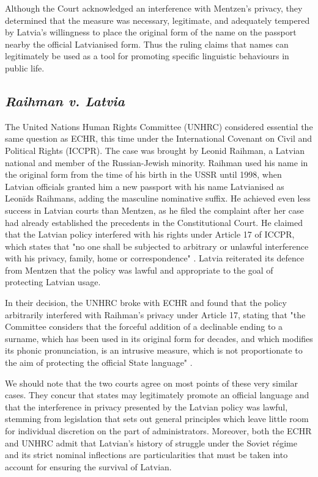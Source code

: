Although the Court acknowledged an interference with Mentzen's privacy, they determined that the measure was necessary, legitimate, and adequately tempered by Latvia's willingness to place the original form of the name on the passport nearby the official Latvianised form. Thus the ruling claims that names can legitimately be used as a tool for promoting specific linguistic behaviours in public life.

\subsection{\textit{Raihman v. Latvia}}

The United Nations Human Rights Committee (UNHRC) considered essential the same question as ECHR, this time under the International Covenant on Civil and Political Rights (ICCPR). The case was brought by Leonid Raihman, a Latvian national and member of the Russian-Jewish minority. Raihman used his name in the original form from the time of his birth in the USSR until 1998, when Latvian officials granted him a new passport with his name Latvianised as Leonīds Raihmans, adding the masculine nominative suffix. He achieved even less success in Latvian courts than Mentzen, as he filed the complaint after her case had already established the precedents in the Constitutional Court. He claimed that the Latvian policy interfered with his rights under Article 17 of ICCPR, which states that "no one shall be subjected to arbitrary or unlawful interference with his privacy, family, home or correspondence" \parencite{}. Latvia reiterated its defence from Mentzen that the policy was lawful and appropriate to the goal of protecting Latvian usage.

In their decision, the UNHRC broke with ECHR and found that the policy arbitrarily interfered with Raihman's privacy under Article 17, stating that "the Committee considers that the forceful addition of a declinable ending to a surname, which has been used in its original form for decades, and which modifies its phonic pronunciation, is an intrusive measure, which is not proportionate to the aim of protecting the official State language" \parencite[8.3]{}.

We should note that the two courts agree on most points of these very similar cases. They concur that states may legitimately promote an official language and that the interference in privacy presented by the Latvian policy was lawful, stemming from legislation that sets out general principles which leave little room for individual discretion on the part of administrators. Moreover, both the ECHR and UNHRC admit that Latvian's history of struggle under the Soviet régime and its strict nominal inflections are particularities that must be taken into account for ensuring the survival of Latvian.

